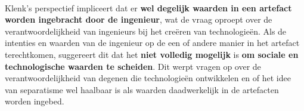 \documentclass[../summary.tex]{subfiles}
\begin{document}
	\ \\
	Klenk's perspectief impliceert dat er \textbf{wel degelijk waarden in een artefact worden ingebracht door de ingenieur}, wat de vraag oproept over de verantwoordelijkheid van ingenieurs bij het creëren van technologieën. Als de intenties en waarden van de ingenieur op de een of andere manier in het artefact terechtkomen, suggereert dit dat het \textbf{niet volledig mogelijk} is \textbf{om sociale en technologische waarden te scheiden}. Dit werpt vragen op over de verantwoordelijkheid van degenen die technologieën ontwikkelen en of het idee van separatisme wel haalbaar is als waarden daadwerkelijk in de artefacten worden ingebed.
	
\end{document}
